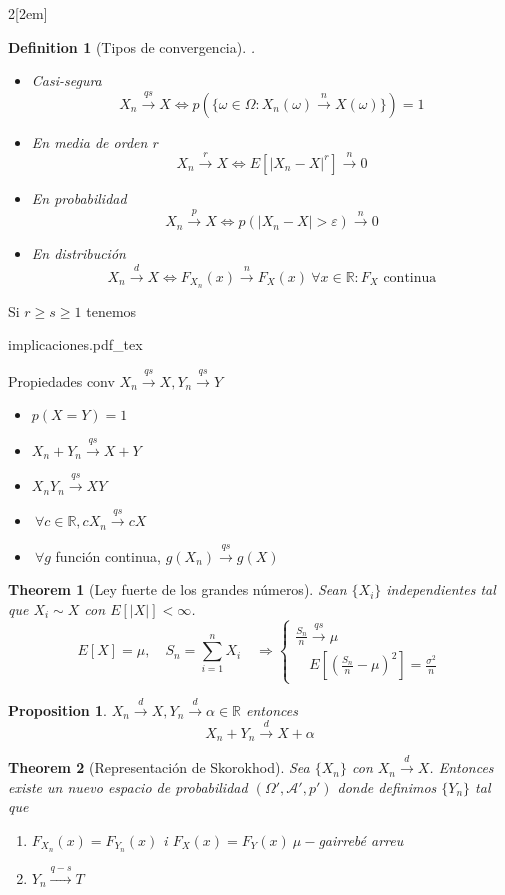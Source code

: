 \documentclass[leqno]{article}
\newtheorem*{theorem}{Theorem}
\newtheorem*{proposition}{Proposition}
\newtheorem*{definition}{Definition}
\newcommand{\incfig}[1]{%
\begin{center}
\def\svgwidth{0.9\columnwidth}
{#1.pdf_tex}
\end{center}
}
\begin{document}
\begin{multicols}{2}[\columnsep2em]
\begin{definition}[Tipos de convergencia].
\begin{itemize}[topsep=-6pt, itemsep=0pt]
  \item Casi-segura 
	\[
	X_n \xrightarrow{qs} X \iff p(\{\omega \in \Omega : X_n(\omega ) \xrightarrow{n} X(\omega )\}) = 1
	\] 
  \item En media de orden $r$
	\[
	X_n \xrightarrow{r} X \iff E[|X_n-X|^r] \xrightarrow{n} 0
	\] 
  \item En probabilidad
	\[
   X_n \xrightarrow{p} X \iff p(|X_n-X| >\varepsilon) \xrightarrow{n} 0
	\] 
  \item En distribución 
	\[
	X_n\xrightarrow{d} X \iff F_{X_n}(x) \xrightarrow{n} F_{X}(x) \ \forall x\in \mathbb{R}: F_X  \text{ continua}
	\] 
\end{itemize}
\end{definition}
Si $r\ge s\ge 1$ tenemos
\incfig{implicaciones}

Propiedades conv $X_n \xrightarrow{qs} X, Y_n \xrightarrow{qs} Y$
\begin{itemize}[topsep=-6pt, itemsep=0pt]
  \item $p(X=Y) = 1$ 
  \item $X_n + Y_n \xrightarrow{qs} X+Y$
  \item $X_nY_n \xrightarrow{qs} XY$
  \item $\ \forall c \in \mathbb{R}, cX_n \xrightarrow{qs} cX$
  \item $\ \forall g$ función continua, $g(X_n) \xrightarrow{qs} g(X)$
\end{itemize}

\begin{theorem}[Ley fuerte de los grandes números]
Sean $\{X_i\}$ independientes tal que  $X_i \sim  X$ con $E[|X|]<\infty$.
\[
E[X] = \mu, \quad S_n = \sum_{i=1}^n X_i \quad \Rightarrow
\begin{cases}
\frac{S_n}{n} \xrightarrow{qs} \mu \\ \quad E\left[ \left( \frac{S_n}{n} - \mu \right)^2  \right] = \frac{\sigma^2}{n}
\end{cases}
\] 
\end{theorem}

\begin{proposition}
$X_n \xrightarrow{d} X, Y_n \xrightarrow{d} \alpha \in \mathbb{R} $ entonces
\[
X_n+Y_n \xrightarrow{d} X+ \alpha 
\] 
\end{proposition}

\begin{theorem}[Representación de Skorokhod] Sea $\{X_n\}$ con  $X_n \xrightarrow{d}  X$. Entonces existe un nuevo espacio de probabilidad $(\Omega ', \mathcal{A}', p')$ donde definimos $\{Y_n\}$ tal que 
   \begin{enumerate}[topsep=-6pt, itemsep=0pt]
    \item $F_{X_n}(x) = F_{Y_n}(x)$ i $F_{X}(x) = F_{Y}(x) \ \mu-$gairrebé arreu
	\item $Y_n \xrightarrow{q-s} T$
  \end{enumerate}
\end{theorem}


\end{multicols}
\end{document}
